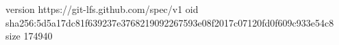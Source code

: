 version https://git-lfs.github.com/spec/v1
oid sha256:5d5a17dc81f639237e3768219092267593e08f2017c07120fd0f609c933e54c8
size 174940
